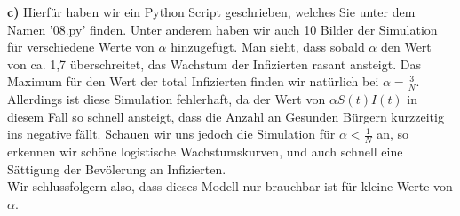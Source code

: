 \documentclass[a4paper]{article}
\begin{document}
\textbf{c)} Hierfür haben wir ein Python Script geschrieben, welches Sie unter dem Namen '08.py' finden.
Unter anderem haben wir auch 10 Bilder der Simulation für verschiedene Werte von $\alpha$
hinzugefügt. Man sieht, dass sobald $\alpha$ den Wert von ca. 1,7 überschreitet, das Wachstum
der Infizierten rasant ansteigt. Das Maximum für den Wert der total Infizierten finden
wir natürlich bei $\alpha = \frac{ 3 }{ N }$. Allerdings ist diese Simulation fehlerhaft,
da der Wert von $\alpha S(t) I(t)$ in diesem Fall so schnell ansteigt, dass
die Anzahl an Gesunden Bürgern kurzzeitig ins negative fällt.
Schauen wir uns jedoch die Simulation für $\alpha < \frac{ 1 }{ N }$ an, so erkennen wir
schöne logistische Wachstumskurven, und auch schnell eine Sättigung der Bevölerung
an Infizierten.
\\

Wir schlussfolgern also, dass dieses Modell nur brauchbar ist für kleine Werte von $\alpha$.
\end{document}
